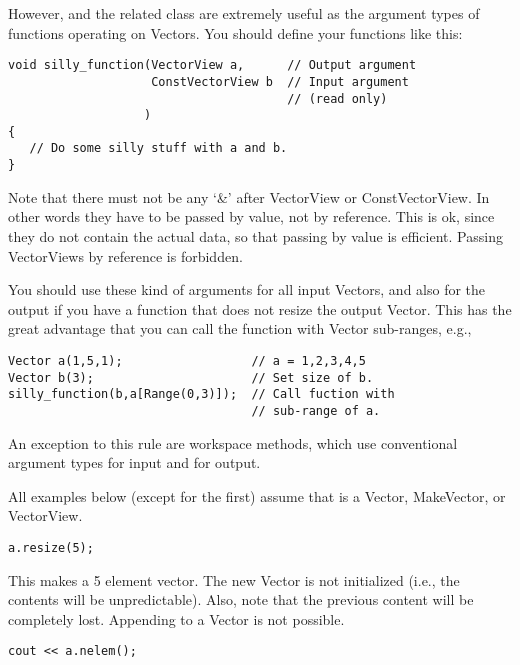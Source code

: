 However,  and the related class
 are extremely useful as the argument types of
functions operating on Vectors. You should define your functions like
this:

\begin{verbatim}
void silly_function(VectorView a,      // Output argument
                    ConstVectorView b  // Input argument
                                       // (read only)
                   )
{
   // Do some silly stuff with a and b.
}
\end{verbatim}

Note that there must not be any `\&' after VectorView or
ConstVectorView. In other words they have to be passed by value, not
by reference. This is ok, since they do not contain the actual
data, so that passing by value is efficient. Passing VectorViews by
reference is forbidden.

You should use these kind of arguments for all input Vectors, and also
for the output if you have a function that does not resize the output
Vector. This has the great advantage that you can call the function
with Vector sub-ranges, e.g., 
\begin{verbatim}
Vector a(1,5,1);                  // a = 1,2,3,4,5
Vector b(3);                      // Set size of b.
silly_function(b,a[Range(0,3)]);  // Call fuction with
                                  // sub-range of a.
\end{verbatim}

An exception to this rule are workspace methods, which use
conventional argument types  for input and
 for output.


All examples below (except for the first) assume that  is a
Vector, MakeVector, or VectorView.

\begin{verbatim}
a.resize(5);
\end{verbatim}
This makes  a 5 element vector. The new Vector is not
initialized (i.e., the contents will be unpredictable). Also, note
that the previous content will be completely lost. Appending to a
Vector is not possible.

\begin{verbatim}
cout << a.nelem();
\end{verbatim}

